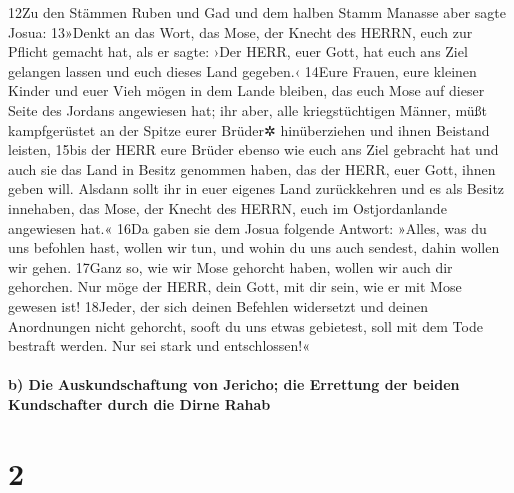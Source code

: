 12Zu den Stämmen Ruben und Gad und dem halben Stamm Manasse aber sagte
Josua: 13»Denkt an das Wort, das Mose, der Knecht des HERRN, euch zur
Pflicht gemacht hat, als er sagte: ›Der HERR, euer Gott, hat euch ans
Ziel gelangen lassen und euch dieses Land gegeben.‹ 14Eure Frauen, eure
kleinen Kinder und euer Vieh mögen in dem Lande bleiben, das euch Mose
auf dieser Seite des Jordans angewiesen hat; ihr aber, alle
kriegstüchtigen Männer, müßt kampfgerüstet an der Spitze eurer Brüder✲
hinüberziehen und ihnen Beistand leisten, 15bis der HERR eure Brüder
ebenso wie euch ans Ziel gebracht hat und auch sie das Land in Besitz
genommen haben, das der HERR, euer Gott, ihnen geben will. Alsdann sollt
ihr in euer eigenes Land zurückkehren und es als Besitz innehaben, das
Mose, der Knecht des HERRN, euch im Ostjordanlande angewiesen hat.« 16Da
gaben sie dem Josua folgende Antwort: »Alles, was du uns befohlen hast,
wollen wir tun, und wohin du uns auch sendest, dahin wollen wir gehen.
17Ganz so, wie wir Mose gehorcht haben, wollen wir auch dir gehorchen.
Nur möge der HERR, dein Gott, mit dir sein, wie er mit Mose gewesen ist!
18Jeder, der sich deinen Befehlen widersetzt und deinen Anordnungen
nicht gehorcht, sooft du uns etwas gebietest, soll mit dem Tode bestraft
werden. Nur sei stark und entschlossen!«

\hypertarget{b-die-auskundschaftung-von-jericho-die-errettung-der-beiden-kundschafter-durch-die-dirne-rahab}{%
\paragraph{b) Die Auskundschaftung von Jericho; die Errettung der beiden
Kundschafter durch die Dirne
Rahab}\label{b-die-auskundschaftung-von-jericho-die-errettung-der-beiden-kundschafter-durch-die-dirne-rahab}}

\hypertarget{section-1}{%
\section{2}\label{section-1}}

